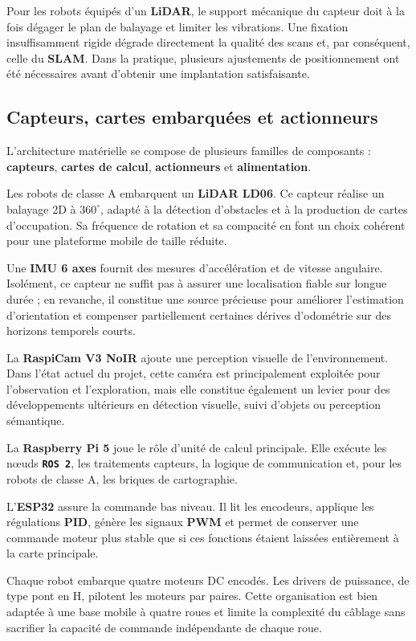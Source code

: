 \documentclass[11pt,a4paper]{report}
\newcommand{\kw}[1]{\textbf{#1}}
\newcommand{\outil}[1]{\textbf{\texttt{#1}}}
\begin{document}
Pour les robots équipés d’un \kw{LiDAR}, le support mécanique du capteur doit à la fois dégager le plan de balayage et limiter les vibrations. Une fixation insuffisamment rigide dégrade directement la qualité des scans et, par conséquent, celle du \kw{SLAM}. Dans la pratique, plusieurs ajustements de positionnement ont été nécessaires avant d’obtenir une implantation satisfaisante.

\subsection{Capteurs, cartes embarquées et actionneurs}

L’architecture matérielle se compose de plusieurs familles de composants : \kw{capteurs}, \kw{cartes de calcul}, \kw{actionneurs} et \kw{alimentation}.

Les robots de classe A embarquent un \kw{LiDAR LD06}. Ce capteur réalise un balayage 2D à \(360^\circ\), adapté à la détection d’obstacles et à la production de cartes d’occupation. Sa fréquence de rotation et sa compacité en font un choix cohérent pour une plateforme mobile de taille réduite.

Une \kw{IMU 6 axes} fournit des mesures d’accélération et de vitesse angulaire. Isolément, ce capteur ne suffit pas à assurer une localisation fiable sur longue durée ; en revanche, il constitue une source précieuse pour améliorer l’estimation d’orientation et compenser partiellement certaines dérives d’odométrie sur des horizons temporels courts.

La \kw{RaspiCam V3 NoIR} ajoute une perception visuelle de l’environnement. Dans l’état actuel du projet, cette caméra est principalement exploitée pour l’observation et l’exploration, mais elle constitue également un levier pour des développements ultérieurs en détection visuelle, suivi d’objets ou perception sémantique.

La \kw{Raspberry Pi 5} joue le rôle d’unité de calcul principale. Elle exécute les nœuds \outil{ROS 2}, les traitements capteurs, la logique de communication et, pour les robots de classe A, les briques de cartographie.

L’\kw{ESP32} assure la commande bas niveau. Il lit les encodeurs, applique les régulations \kw{PID}, génère les signaux \kw{PWM} et permet de conserver une commande moteur plus stable que si ces fonctions étaient laissées entièrement à la carte principale.

Chaque robot embarque quatre moteurs DC encodés. Les drivers de puissance, de type pont en H, pilotent les moteurs par paires. Cette organisation est bien adaptée à une base mobile à quatre roues et limite la complexité du câblage sans sacrifier la capacité de commande indépendante de chaque roue.
\end{document}
